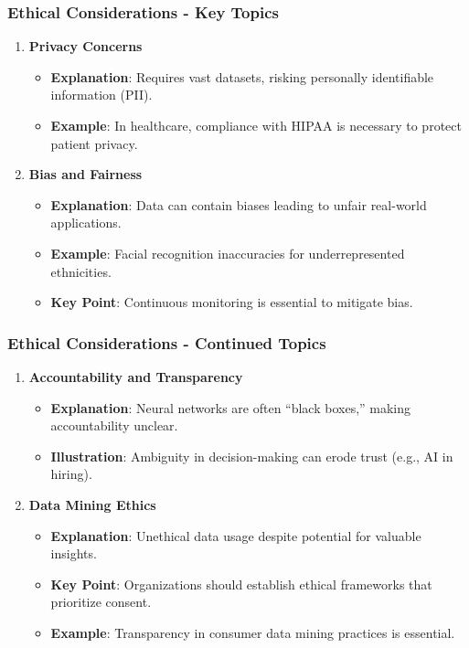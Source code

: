\documentclass[aspectratio=169]{beamer}
\begin{document}
\begin{frame}[fragile]
    \frametitle{Ethical Considerations - Key Topics}
    \begin{enumerate}
        \item \textbf{Privacy Concerns}
            \begin{itemize}
                \item \textbf{Explanation}: Requires vast datasets, risking personally identifiable information (PII).
                \item \textbf{Example}: In healthcare, compliance with HIPAA is necessary to protect patient privacy.
            \end{itemize}
        \item \textbf{Bias and Fairness}
            \begin{itemize}
                \item \textbf{Explanation}: Data can contain biases leading to unfair real-world applications.
                \item \textbf{Example}: Facial recognition inaccuracies for underrepresented ethnicities.
                \item \textbf{Key Point}: Continuous monitoring is essential to mitigate bias.
            \end{itemize}
    \end{enumerate}
\end{frame}

\begin{frame}[fragile]
    \frametitle{Ethical Considerations - Continued Topics}
    \begin{enumerate}[resume]
        \item \textbf{Accountability and Transparency}
            \begin{itemize}
                \item \textbf{Explanation}: Neural networks are often “black boxes,” making accountability unclear.
                \item \textbf{Illustration}: Ambiguity in decision-making can erode trust (e.g., AI in hiring).
            \end{itemize}
        \item \textbf{Data Mining Ethics}
            \begin{itemize}
                \item \textbf{Explanation}: Unethical data usage despite potential for valuable insights.
                \item \textbf{Key Point}: Organizations should establish ethical frameworks that prioritize consent.
                \item \textbf{Example}: Transparency in consumer data mining practices is essential.
            \end{itemize}
    \end{enumerate}
\end{frame}
\end{document}
